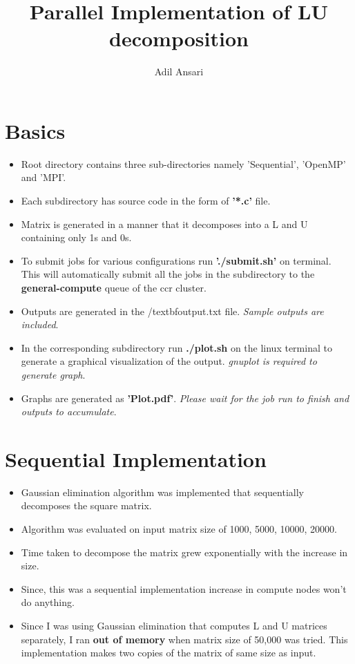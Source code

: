 \documentclass{article}
\title{Parallel Implementation of LU decomposition}
\author{Adil Ansari}
\begin{document}
\maketitle

\section{Basics}
\begin{itemize}
\item Root directory contains three sub-directories namely 'Sequential', 'OpenMP' and 'MPI'.
\item Each subdirectory has source code in the form of \textbf{ '*.c'} file.
\item Matrix is generated in a manner that it decomposes into a L and U containing only 1s and 0s.
\item To submit jobs for various configurations run \textbf{'./submit.sh'} on terminal. This will automatically submit all the jobs in the subdirectory to the \textbf{general-compute} queue of the ccr cluster.
\item Outputs are generated in the /textbf{output.txt} file. \textit{Sample outputs are included}.
\item In the corresponding subdirectory run \textbf{./plot.sh} on the linux terminal to generate a graphical visualization of the output. \textit{gnuplot is required to generate graph}.
\item Graphs are generated as \textbf{'Plot.pdf'}. \textit{Please wait for the job run to finish and outputs to accumulate}.
\end{itemize}

\section{Sequential Implementation}
\begin{itemize}
\item Gaussian elimination algorithm was implemented that sequentially decomposes the square matrix. 
\item Algorithm was evaluated on input matrix size of 1000, 5000, 10000, 20000. 
\item Time taken to decompose the matrix grew exponentially with the increase in size.
\item Since, this was a sequential implementation increase in compute nodes won't do anything.
\item Since I was using Gaussian elimination that computes L and U matrices separately, I ran \textbf{out of memory} when matrix size of 50,000 was tried. This implementation makes two copies of the matrix of same size as input.
\end{itemize}
\end{document}
